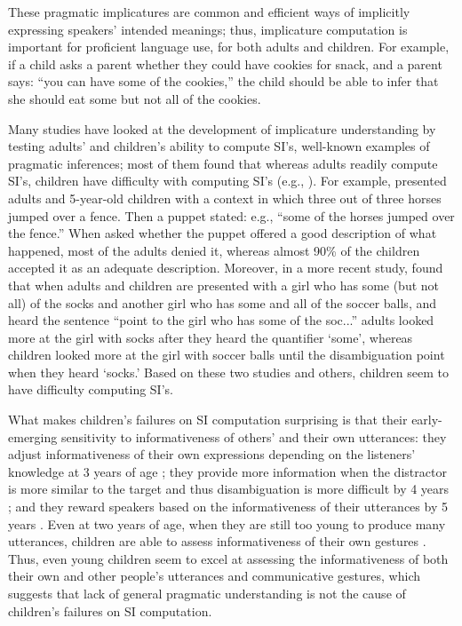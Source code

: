 \documentclass[10pt,letterpaper]{article}
\begin{document}
These pragmatic implicatures are common and efficient ways of implicitly expressing speakers' intended meanings; thus, implicature computation is important for proficient language use, for both adults and children. For example, if a child asks a parent whether they could have cookies for snack, and a parent says: ``you can have some of the cookies,'' the child should be able to infer that she should eat some but not all of the cookies.

Many studies have looked at the development of implicature understanding by testing adults' and children's ability to compute SI's, well-known examples of pragmatic inferences; most of them found that whereas adults readily compute SI's, children have difficulty with computing SI's (e.g., ). For example,  presented adults and 5-year-old children with a context in which three out of three horses jumped over a fence. Then a puppet stated: e.g., ``some of the horses jumped over the fence.'' When asked whether the puppet offered a good description of what happened, most of the adults denied it, whereas almost 90\% of the children accepted it as an adequate description. Moreover, in a more recent study,  found that when adults and children are presented with a girl who has some (but not all) of the socks and another girl who has some and all of the soccer balls, and heard the sentence ``point to the girl who has some of the soc...'' adults looked more at the girl with socks after they heard the quantifier `some', whereas children looked more at the girl with soccer balls until the disambiguation point when they heard `socks.' Based on these two studies and others, children seem to have difficulty computing SI's.

What makes children's failures on SI computation surprising is that their early-emerging sensitivity to informativeness of others' and their own utterances: they adjust informativeness of their own expressions depending on the listeners' knowledge at 3 years of age \cite{matthews2006effect}; they provide more information when the distractor is more similar to the target and thus disambiguation is more difficult by 4 years \cite{matthews2012two}; and they reward speakers based on the informativeness of their utterances by 5 years \cite{katsos2011pragmatic}. Even at two years of age, when they are still too young to produce many utterances, children are able to assess informativeness of their own gestures \cite{o2001two}. Thus, even young children seem to excel at assessing the informativeness of both their own and other people's utterances and communicative gestures, which suggests that lack of general pragmatic understanding is not the cause of children's failures on SI computation. 
\end{document}
